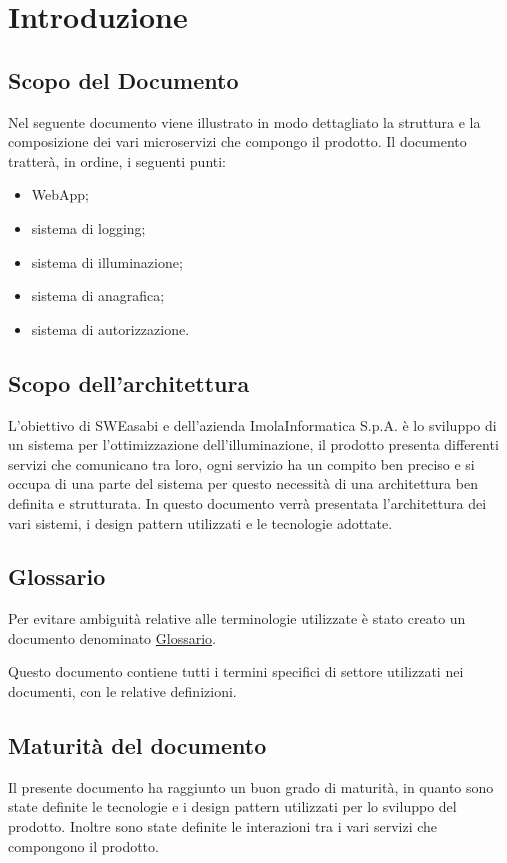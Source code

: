\chapter{Introduzione}

\section{Scopo del Documento}
Nel seguente documento viene illustrato in modo dettagliato la struttura e la composizione dei vari microservizi che compongo il prodotto. Il documento tratterà, in ordine, i seguenti punti:
\begin{itemize}
    \item WebApp;
    \item sistema di logging;
    \item sistema di illuminazione;
    \item sistema di anagrafica;
    \item sistema di autorizzazione.
\end{itemize}

\section{Scopo dell'architettura}
L'obiettivo di SWEasabi e dell'azienda ImolaInformatica S.p.A. è lo sviluppo di un sistema per l'ottimizzazione dell'illuminazione, il prodotto presenta differenti servizi che comunicano tra loro, ogni servizio ha un compito ben preciso e si occupa di una parte del sistema per questo necessità di una architettura ben definita e strutturata.
In questo documento verrà presentata l'architettura dei vari sistemi, i design pattern utilizzati e le tecnologie adottate.


\section{Glossario}
Per evitare ambiguità relative alle terminologie utilizzate è stato creato un documento denominato \href{https://github.com/SWEasabi/glossario/releases}{Glossario}.

Questo documento contiene tutti i termini specifici di settore utilizzati nei documenti, con le relative definizioni.

\section{Maturità del documento}
Il presente documento ha raggiunto un buon grado di maturità, in quanto sono state definite le tecnologie e i design pattern utilizzati per lo sviluppo del prodotto. Inoltre sono state definite le interazioni tra i vari servizi che compongono il prodotto.

